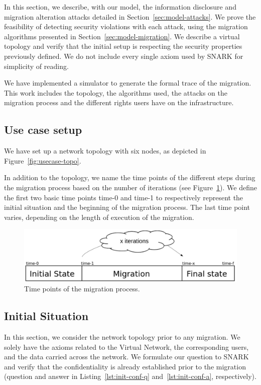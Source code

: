 \label{sec:model-usecase}
In this section, we describe, with our model, the information disclosure and migration alteration attacks detailed in Section~\ref{sec:model-attacks}.
We prove the feasibility of detecting security violations with each attack, using the migration algorithms presented in Section~\ref{sec:model-migration}.
We describe a virtual topology and verify that the initial setup is respecting the security properties previously defined.
We do not include every single axiom used by SNARK for simplicity of reading.

We have implemented a simulator to generate the formal trace of the migration.
This work includes the topology, the algorithms used, the attacks on the migration process and the different rights users have on the infrastructure.

\subsection{Use case setup}
We have set up a network topology with six nodes, as depicted in Figure~\ref{fig:usecase-topo}.

In addition to the topology, we name the time points of the different steps during the migration process based on the number of iterations (see Figure~\ref{fig:time-points}).
We define the first two basic time points time-0 and time-1 to respectively represent the initial situation and the beginning of the migration process. The last time point varies, depending on the length of execution of the migration.


\begin{figure}[htbp]
\centering
\includegraphics[scale=0.45]{figures/time-points-evolution} 
\caption{Time points of the migration process.\label{fig:time-points}}
\end{figure}

\newpage
\subsection{Initial Situation}
In this section, we consider the network topology prior to any migration.
We solely have the axioms related to the Virtual Network, the corresponding users, and the data carried across the network.
We formulate our question to SNARK and verify that the confidentiality is already established prior to the migration (question and answer in Listing~\ref{lst:init-conf-q} and~\ref{lst:init-conf-a}, respectively).



